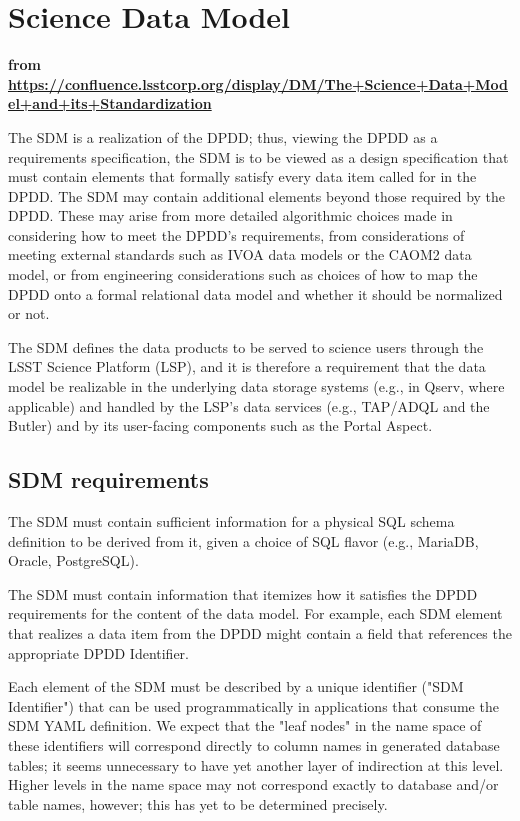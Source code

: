 
\section {Science Data Model}\label{sec:sdm}
{\bf from  \tiny \url{https://confluence.lsstcorp.org/display/DM/The+Science+Data+Model+and+its+Standardization}}

The SDM is a realization of the DPDD; thus, viewing the DPDD as a requirements specification, the SDM is to be viewed as a design specification that must contain elements that formally satisfy every data item called for in the DPDD.  The SDM may contain additional elements beyond those required by the DPDD.  These may arise from more detailed algorithmic choices made in considering how to meet the DPDD's requirements, from considerations of meeting external standards such as IVOA data models or the CAOM2 data model, or from engineering considerations such as choices of how to map the DPDD onto a formal relational data model and whether it should be normalized or not.

The SDM defines the data products to be served to science users through the LSST Science Platform (LSP), and it is therefore a requirement that the data model be realizable in the underlying data storage systems (e.g., in Qserv, where applicable) and handled by the LSP's data services (e.g., TAP/ADQL and the Butler) and by its user-facing components such as the Portal Aspect.

\subsection{SDM requirements}
The SDM must contain sufficient information for a physical SQL schema definition to be derived from it, given a choice of SQL flavor (e.g., MariaDB, Oracle, PostgreSQL).

The SDM must contain information that itemizes how it satisfies the DPDD requirements for the content of the data model.  For example, each SDM element that realizes a data item from the DPDD might contain a field that references the appropriate DPDD Identifier.

Each element of the SDM must be described by a unique identifier ("SDM Identifier") that can be used programmatically in applications that consume the SDM YAML definition.  We expect that the "leaf nodes" in the name space of these identifiers will correspond directly to column names in generated database tables; it seems unnecessary to have yet another layer of indirection at this level.  Higher levels in the name space may not correspond exactly to database and/or table names, however; this has yet to be determined precisely.

